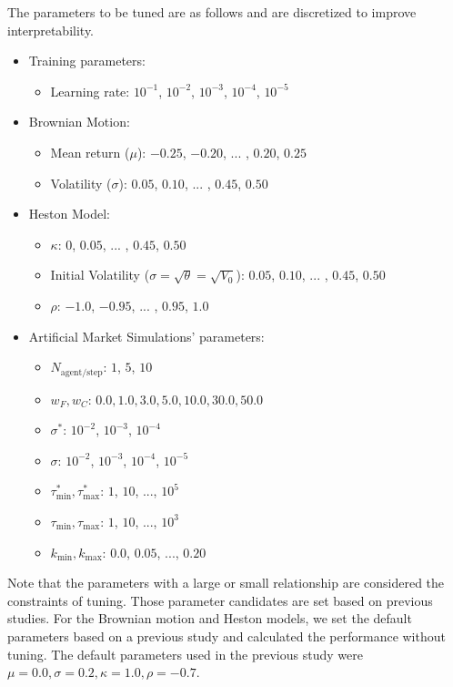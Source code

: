 The parameters to be tuned are as follows and are discretized to improve interpretability.
\begin{itemize}
    \item Training parameters:\begin{itemize}
              \item Learning rate: $10^{-1}$, $10^{-2}$, $10^{-3}$, $10^{-4}$, $10^{-5}$
          \end{itemize}
    \item Brownian Motion:\begin{itemize}
              \item Mean return ($\mu$): $-0.25$, $-0.20$, ... , $0.20$, $0.25$
              \item Volatility ($\sigma$): $0.05$, $0.10$, ... , $0.45$, $0.50$
          \end{itemize}
    \item Heston Model:\begin{itemize}
              \item $\kappa$: $0$, $0.05$, ... , $0.45$, $0.50$
              \item Initial Volatility ($\sigma = \sqrt{\theta} = \sqrt{V_0}$): $0.05$, $0.10$, ... , $0.45$, $0.50$
              \item $\rho$: $-1.0$, $-0.95$, ... , $0.95$, $1.0$
          \end{itemize}
    \item Artificial Market Simulations' parameters: \begin{itemize}
              \item $N_{\mathrm{agent/step}}$: $1$, $5$, $10$
              \item $w_F, w_C$: $0.0, 1.0, 3.0, 5.0, 10.0, 30.0, 50.0$
              \item $\sigma^{*}$: $10^{-2}$, $10^{-3}$, $10^{-4}$
              \item $\sigma$: $10^{-2}$, $10^{-3}$, $10^{-4}$, $10^{-5}$
              \item $\tau^{*}_{\mathrm{min}}, \tau^{*}_{\mathrm{max}}$: $1$, $10$, ..., $10^{5}$
              \item $\tau_{\mathrm{min}}, \tau_{\mathrm{max}}$: $1$, $10$, ..., $10^{3}$
              \item $k_{\mathrm{min}}, k_{\mathrm{max}}$: $0.0$, $0.05$, ..., $0.20$
          \end{itemize}
\end{itemize}
Note that the parameters with a large or small relationship are considered the constraints of tuning.
Those parameter candidates are set based on previous studies.
For the Brownian motion and Heston models, we set the default parameters based on a previous study \cite{deep-hedging} and calculated the performance without tuning.
The default parameters used in the previous study were $\mu=0.0, \sigma=0.2, \kappa=1.0, \rho = -0.7$.

